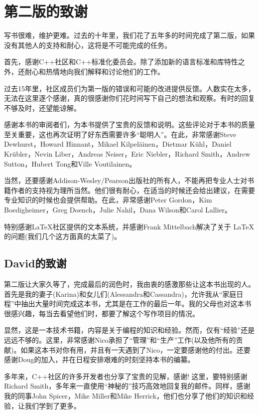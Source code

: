 \chapter{第二版的致谢}

写书很难，维护更难。过去的十年里，我们花了五年多的时间完成了第二版，如果没有其他人的支持和耐心，这将是不可能完成的任务。

首先，感谢C++社区和C++标准化委员会。除了添加新的语言标准和库特性之外，还耐心和热情地向我们解释和讨论他们的工作。

过去15年里，社区成员们为第一版的错误和可能的改进提供反馈。人数实在太多，无法在这里逐个感谢，真的很感谢你们花时间写下自己的想法和观察。有时的回复不够及时，还望能谅解。

感谢本书的审阅者们，为本书提供了宝贵的反馈和说明。这些评论对于本书的质量至关重要，这也再次证明了好东西需要许多“聪明人”。在此，非常感谢Steve Dewhurst，Howard Hinnant，Mikael Kilpel{\"a}inen，Dietmar K{\"u}hl，Daniel Kr{\"u}bler，Nevin Liber，Andreas Neiser，Eric Niebler，Richard Smith，Andrew Sutton，Hubert Tong和Ville Voutilainen。

当然，还要感谢Addison-Wesley/Pearson出版社的所有人，不能再把专业人士对书籍作者的支持视为理所当然。他们很有耐心，在适当的时候还会给出建议，在需要专业知识的时候也会提供帮助。在此，非常感谢Peter Gordon，Kim Boedigheimer，Greg Doench，Julie Nahil，Dana
Wilson和Carol Lallier。

特别感谢LaTeX社区提供的文本系统，并感谢Frank Mittelbach解决了关于 \LaTeX 的问题(我们几个这方面真的太菜了)。

\section{David的致谢}

第二版让大家久等了，完成最后的润色时，我由衷的感激那些让这本书出现的人。首先是我的妻子(Karina)和女儿们(Alessandra和Cassandra)，允许我从“家庭日程”中抽出大量时间完成这本书，尤其是在工作的最后一年。我的父母也对这本书很感兴趣，每当去看望他们时，都要了解这个写作项目的情况。

显然，这是一本技术书籍，内容是关于编程的知识和经验。然而，仅有“经验”还是远远不够的。这里，非常感谢Nico承担了“管理”和“生产”工作(以及他所有的贡献)。如果这本书对你有用，并且有一天遇到了Nico，一定要感谢他的付出。还要感谢Doug的加入，并在日程安排艰难的时刻坚持本书的编纂。

多年来，C++社区的许多开发者也分享了宝贵的见解，感谢! 这里，要特别感谢Richard Smith，多年来一直使用“神秘的”技巧高效地回复我的邮件。同样，感谢我的同事John Spicer，Mike Miller和Mike Herrick，他们也分享了他们的知识和经验，让我们学到了更多。

